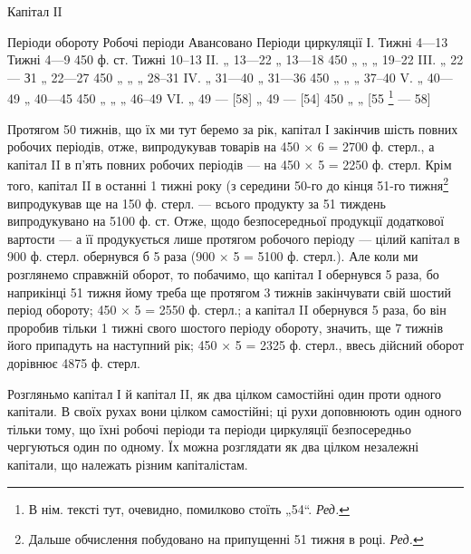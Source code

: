 Капітал ІI

Періоди обороту    Робочі періоди    Авансовано    Періоди циркуляції
І. Тижні 4—13  Тижні 4—9    450 ф. ст. Тижні 10--13
II. „ 13—22 „ 13—18    450 „ „ „ 19--22
III. „ 22 — З1 „ 22—27    450 „ „ „ 28--31
IV. „ 31—40 „ 31—36    450 „ „ „ 37--40
V. „ 40—49 „ 40—45    450 „ „ „ 46--49
VI. „ 49 — [58]  „ 49 — [54] 450 „ „ [55 \footnote*{
В нім. тексті тут, очевидно, помилково стоїть „54“. \emph{Ред.}
} — 58]

Протягом 50 тижнів, що їх ми тут беремо за рік, капітал І закінчив
шість повних робочих періодів, отже, випродукував товарів на 450 × 6
= 2700 ф. стерл., а капітал II в п’ять повних робочих періодів — на
450 × 5 = 2250 ф. стерл. Крім того, капітал II в останні 1 тижні року
(з середини 50-го до кінця 51-го тижня\footnote*{
Дальше обчислення побудовано на припущенні 51 тижня в році. \emph{Ред.}
} випродукував ще на 150 ф.
стерл. — всього продукту за 51 тиждень випродукувано на 5100 ф. ст.
Отже, щодо безпосередньої продукції додаткової вартости — а її продукується
лише протягом робочого періоду — цілий капітал в 900 ф. стерл. обернувся
б 5 раза (900 × 5 = 5100 ф. стерл.). Але коли ми розглянемо
справжній оборот, то побачимо, що капітал І обернувся 5 раза, бо
наприкінці 51 тижня йому треба ще протягом 3 тижнів закінчувати
свій шостий період обороту; 450 × 5 = 2550 ф. стерл.; а капітал
II обернувся 5 раза, бо він проробив тільки 1 тижні свого
шостого періоду обороту, значить, ще 7 тижнів його припадуть на
наступний рік; 450 × 5 = 2325 ф. стерл., ввесь дійсний оборот дорівнює
4875 ф. стерл.

Розгляньмо капітал І й капітал II, як два цілком самостійні один проти
одного капітали. В своїх рухах вони цілком самостійні; ці рухи доповнюють
один одного тільки тому, що їхні робочі періоди та періоди
циркуляції безпосередньо чергуються один по одному. Їх можна розглядати
як два цілком незалежні капітали, що належать різним капіталістам.

